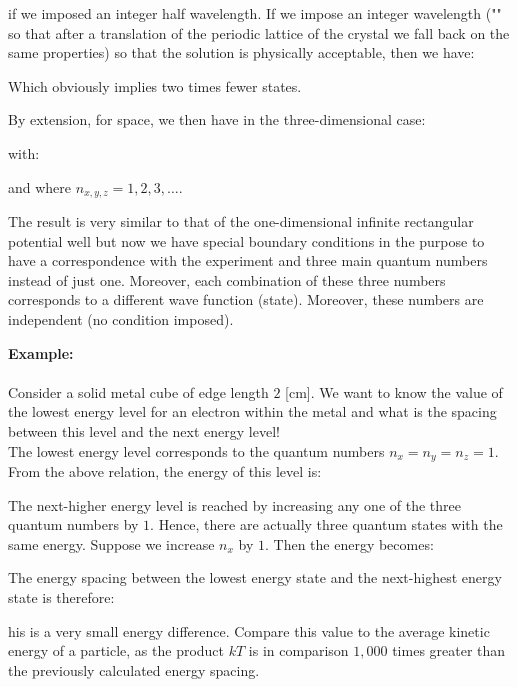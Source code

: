 	if we imposed an integer half wavelength. If we impose an integer wavelength ("" so that after a translation of the periodic lattice of the crystal we fall back on the same properties) so that the solution is physically acceptable, then we have:
	
	Which obviously implies two times fewer states.

	By extension, for space, we then have in the three-dimensional case:
	
	with:
	
	and where $n_{x,y,z}=1,2,3,\ldots$.
	
	The result is very similar to that of the one-dimensional infinite rectangular potential well but now we have special boundary conditions in the purpose to have a correspondence with the experiment and three main quantum numbers instead of just one. Moreover, each combination of these three numbers corresponds to a different wave function (state). Moreover, these numbers are independent (no condition imposed).
	\begin{tcolorbox}[colframe=black,colback=white,sharp corners]
	\textbf{{\Large {}}Example:}\\\\
	Consider a solid metal cube of edge length $2$ [cm]. We want to know the value of the lowest energy level for an electron within the metal and what is the spacing between this level and the next energy level!\\
	
	The lowest energy level corresponds to the quantum numbers $n_x=n_y=n_z=1$. From the above relation, the energy of this level is:
	
	The next-higher energy level is reached by increasing any one of the three quantum numbers by $1$. Hence, there are actually three quantum states with the same energy. Suppose we increase $n_x$ by $1$. Then the energy becomes:
	\end{tcolorbox}
	\begin{tcolorbox}[colframe=black,colback=white,sharp corners]
	
	The energy spacing between the lowest energy state and the next-highest energy state is therefore:
	
	his is a very small energy difference. Compare this value to the average kinetic energy of a particle, as the product $kT$ is in comparison $1,000$ times greater than the previously calculated energy spacing.
	\end{tcolorbox}
	
